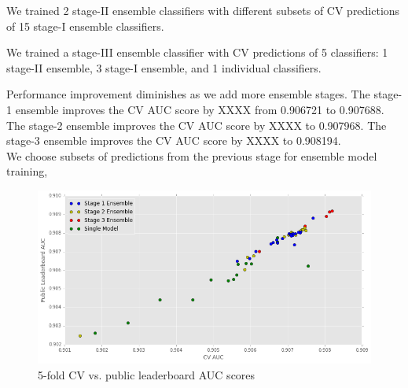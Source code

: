 We trained 2 stage-II ensemble classifiers with different subsets of CV predictions of 15 stage-I ensemble classifiers.

We trained a stage-III ensemble classifier with CV predictions of 5 classifiers: 1 stage-II ensemble, 3 stage-I ensemble, and 1 individual classifiers.

Performance improvement diminishes as we add more ensemble stages.  The stage-1 ensemble improves the CV AUC score by XXXX from 0.906721 to 0.907688.  The stage-2 ensemble improves the CV AUC score by XXXX to 0.907968.  The stage-3 ensemble improves the CV AUC score by XXXX to 0.908194.\\

We choose subsets of predictions from the previous stage for ensemble model training, 
\begin{figure}[t]
  \caption{5-fold CV vs. public leaderboard AUC scores}
  \centering
    \includegraphics[width=0.5 \textwidth]{cv_lb}
\end{figure}



